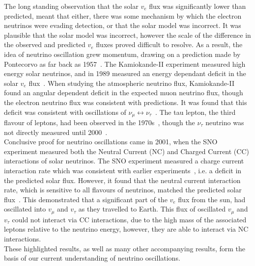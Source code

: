 The long standing observation that the solar $v_{e}$ flux was significantly lower than predicted, meant that either, there was some mechanism by which the electron neutrinos were evading detection, or that the solar model was incorrect. It was plausible that the solar model was incorrect, however the scale of the difference in the observed and predicted $v_{e}$ fluxes proved difficult to resolve. As a result, the idea of neutrino oscillation grew momentum, drawing on a prediction made by Pontecorvo as far back as 1957~\citep{Pontecorvo1957}. The Kamiokande-II experiment measured high energy solar neutrinos, and in 1989 measured an energy dependant deficit in the solar $v_{e}$ flux~\citep{PhysRevLett.63.16}. When studying the atmospheric neutrino flux, Kamiokande-II found an angular dependent deficit in the expected muon neutrino flux, though the electron neutrino flux was consistent with predictions. It was found that this deficit was consistent with oscillations of $\nu_{\mu} \leftrightarrow \nu_{\tau}$~\citep{PhysRevLett.81.1562}. The tau lepton, the third flavour of leptons, had been observed in the 1970s~\citep{PhysRevLett.35.1489}, though the $\nu_{\tau}$ neutrino was not directly measured until 2000~\citep{Kodama2001218}. \\

Conclusive proof for neutrino oscillations came in 2001, when the SNO experiment measured both the Neutral Current (NC) and Charged Current (CC) interactions of solar neutrinos. The SNO experiment measured a charge current interaction rate which was consistent with earlier experiments~\citep{Ahmad:2001an}, i.e. a deficit in the predicted solar flux. However, it found that the neutral current interaction rate, which is sensitive to all flavours of neutrinos, matched the predicted solar flux~\citep{PhysRevLett.89.011301}. This demonstrated that a significant part of the $v_{e}$ flux from the sun, had oscillated into $v_{\mu}$ and $v_{\tau}$ as they travelled to Earth. This flux of oscillated $v_{\mu}$ and $v_{\tau}$ could not interact via CC interactions, due to the high mass of the associated leptons relative to the neutrino energy, however, they are able to interact via NC interactions. \\

These highlighted results, as well as many other accompanying results, form the basis of our current understanding of neutrino oscillations. \\

